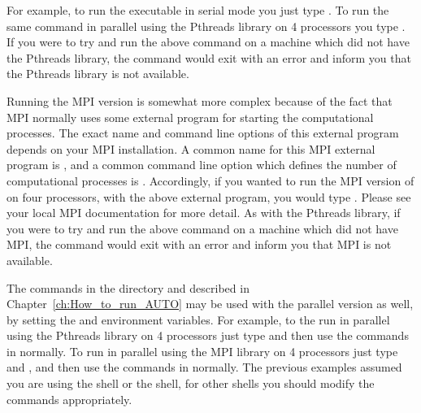 For example, to run the \AUTOc executable 
in serial mode you just type .  To run the
same command in parallel using the Pthreads library
on 4 processors you type .
If you were to try and run the above command on a machine
which did not have the Pthreads library, the command
would exit with an error and inform you that the Pthreads
library is not available.

Running the MPI version is somewhat more complex because of the fact
that MPI normally uses some external program for starting the
computational processes.  The exact name and command line options of
this external program depends on your MPI installation.  A common name
for this MPI external program is , and a common command
line option which defines the number of computational processes is .  Accordingly, if you wanted to run the MPI version of \AUTOc 
on four processors, with the above external program, you would
type .  Please see your local MPI
documentation for more detail.  As with the Pthreads library, if you
were to try and run the above command on a machine which did not have
MPI, the command would exit with an error and inform you that MPI is
not available.

The commands in the  directory and described
in Chapter~\ref{ch:How_to_run_AUTO} may be used with the
parallel version as well, by setting the 
and  environment variables.  For example, to
the run \AUTOc in parallel using the Pthreads library on 4
processors just type  and then use the commands in  normally.  To
run \AUTOold in parallel using the MPI library on 4
processors just type  and 
, and then use the
commands in  normally.  The previous examples
assumed you are using the  shell or the  shell, for
other shells you should modify the commands appropriately.








